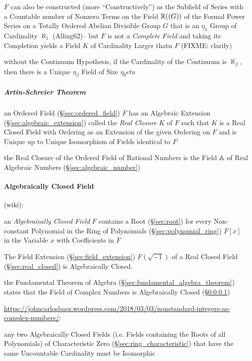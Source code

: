 $F$ can also be constructed (more ``Constructively'') as the Subfield of Series
with a Countable number of Nonzero Terms on the Field $\mathbb{R}((G))$ of the
Formal Power Series on a Totally Ordered Abelian Divisible Group $G$ that is an
$\eta_1$ Group of Cardinality $\aleph_1$ (Alling62)-- but $F$ is not a
\emph{Complete Field} and taking its Completion yields a Field $K$ of
Cardinality Larger thatn $F$ (FIXME: clarify)

without the Continuum Hypothesis, if the Cardinality of the Continuum is
$\aleph_\beta$, then there is a Unique $\eta_\beta$ Field of Size $\eta_beta$



\subparagraph{Artin-Schreier Theorem}\label{sec:artin_schreier}\hfill

an Ordered Field (\S\ref{sec:ordered_field}) $F$ has an Algebraic Extension
(\S\ref{sec:algebraic_extension}) called the \emph{Real Closure} $K$ of $F$
such that $K$ is a Real Closed Field with Ordering as an Extension of the given
Ordering on $F$ and is Unique up to Unique Isomorphism of Fields identical to
$F$

the Real Closure of the Ordered Field of Rational Numbers is the Field
$\mathbb{A}$ of Real Algebraic Numbers (\S\ref{sec:algebraic_number})



\paragraph{Algebraically Closed Field}\label{sec:algebraically_closed}
\hfill

(wiki):

an \emph{Algebraically Closed Field} $F$ contains a Root
(\S\ref{sec:root}) for every Non-constant Polynomial in the Ring of
Polynomials (\S\ref{sec:polynomial_ring}) $F[x]$ in the Variable $x$ with
Coefficients in $F$

The Field Extension (\S\ref{sec:field_extension}) $F(\sqrt{-1})$ of a
Real Closed Field (\S\ref{sec:real_closed}) is Algebraically Closed.

the Fundamental Theorem of Algebra (\S\ref{sec:fundamental_algebra_theorem})
states that the Field of Complex Numbers is Algebraically Closed
(\S\ref{sec:algebraically_closed})

\url{https://johncarlosbaez.wordpress.com/2018/03/03/nonstandard-integers-as-complex-numbers/}:

any two Algebraically Closed Fields (i.e. Fields containing the Roots of all
Polynomials) of Characteristic Zero (\S\ref{sec:ring_characteristic}) that have
the same Uncountable Cardinality must be Isomorphic

